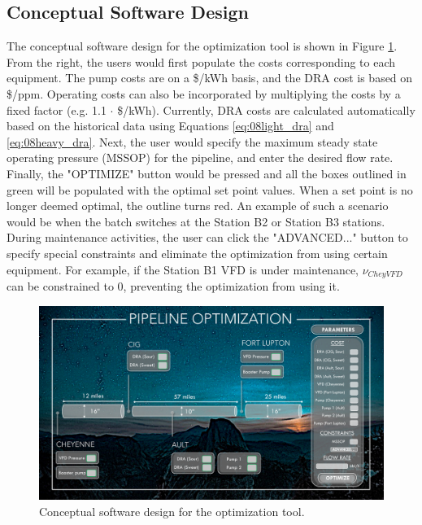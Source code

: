 \subsection{Conceptual Software Design}
The conceptual software design for the optimization tool is shown in Figure \ref{fig:08concept_software}. From the right, the users would first populate the costs corresponding to each equipment.  The pump costs are on a \$/kWh basis, and the DRA cost is based on \$/ppm. Operating costs can also be incorporated by multiplying the costs by a fixed factor (e.g. 1.1 $\cdot$ \$/kWh). Currently, DRA costs are calculated automatically based on the historical data using Equations \ref{eq:08light_dra} and \ref{eq:08heavy_dra}. Next, the user would specify the maximum steady state operating pressure (MSSOP) for the pipeline, and enter the desired flow rate.  Finally, the "OPTIMIZE" button would be pressed and all the boxes outlined in green will be populated with the optimal set point values.  When a set point is no longer deemed optimal, the outline turns red.  An example of such a scenario would be when the batch switches at the Station B2 or Station B3 stations.  During maintenance activities, the user can click the "ADVANCED..." button to specify special constraints and eliminate the optimization from using certain equipment. For example, if the Station B1 VFD is under maintenance, $\nu_{Chey VFD}$ can be constrained to 0, preventing the optimization from using it.

\begin{figure}[h]
    \centering
    \includegraphics[width=\textwidth]{images/suncor/08conceptual_software.pdf}
    \caption{Conceptual software design for the optimization tool.}
    \label{fig:08concept_software}
\end{figure}

